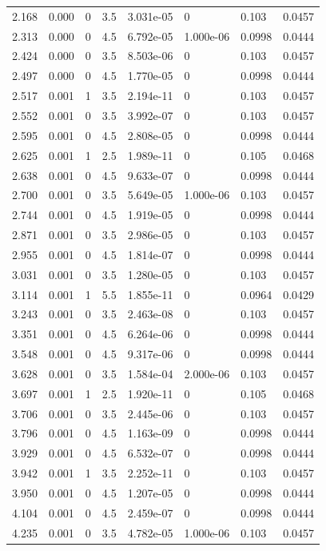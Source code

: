 \documentclass[preview]{standalone}
\begin{document}
{{\begin{tabular}{L{1.2cm}C{1.2cm} C{0.3cm}C{0.5cm} C{1.4cm}C{1.4cm} C{1.4cm}C{1.4cm}}
  2.168  &  0.000  & 0     & 3.5 &  3.031e-05  & 0  & 0.103 &  0.0457   \\ 
  2.313  &  0.000  & 0     & 4.5 &  6.792e-05  & 1.000e-06  & 0.0998 &  0.0444   \\ 
  2.424  &  0.000  & 0     & 3.5 &  8.503e-06  & 0  & 0.103 &  0.0457   \\ 
  2.497  &  0.000  & 0     & 4.5 &  1.770e-05  & 0  & 0.0998 &  0.0444   \\ 
  2.517  &  0.001  & 1     & 3.5 &  2.194e-11  & 0  & 0.103 &  0.0457   \\ 
  2.552  &  0.001  & 0     & 3.5 &  3.992e-07  & 0  & 0.103 &  0.0457   \\ 
  2.595  &  0.001  & 0     & 4.5 &  2.808e-05  & 0  & 0.0998 &  0.0444   \\ 
  2.625  &  0.001  & 1     & 2.5 &  1.989e-11  & 0  & 0.105 &  0.0468   \\ 
  2.638  &  0.001  & 0     & 4.5 &  9.633e-07  & 0  & 0.0998 &  0.0444   \\ 
  2.700  &  0.001  & 0     & 3.5 &  5.649e-05  & 1.000e-06  & 0.103 &  0.0457   \\ 
  2.744  &  0.001  & 0     & 4.5 &  1.919e-05  & 0  & 0.0998 &  0.0444   \\ 
  2.871  &  0.001  & 0     & 3.5 &  2.986e-05  & 0  & 0.103 &  0.0457   \\ 
  2.955  &  0.001  & 0     & 4.5 &  1.814e-07  & 0  & 0.0998 &  0.0444   \\ 
  3.031  &  0.001  & 0     & 3.5 &  1.280e-05  & 0  & 0.103 &  0.0457   \\ 
  3.114  &  0.001  & 1     & 5.5 &  1.855e-11  & 0  & 0.0964 &  0.0429   \\ 
  3.243  &  0.001  & 0     & 3.5 &  2.463e-08  & 0  & 0.103 &  0.0457   \\ 
  3.351  &  0.001  & 0     & 4.5 &  6.264e-06  & 0  & 0.0998 &  0.0444   \\ 
  3.548  &  0.001  & 0     & 4.5 &  9.317e-06  & 0  & 0.0998 &  0.0444   \\ 
  3.628  &  0.001  & 0     & 3.5 &  1.584e-04  & 2.000e-06  & 0.103 &  0.0457   \\ 
  3.697  &  0.001  & 1     & 2.5 &  1.920e-11  & 0  & 0.105 &  0.0468   \\ 
  3.706  &  0.001  & 0     & 3.5 &  2.445e-06  & 0  & 0.103 &  0.0457   \\ 
  3.796  &  0.001  & 0     & 4.5 &  1.163e-09  & 0  & 0.0998 &  0.0444   \\ 
  3.929  &  0.001  & 0     & 4.5 &  6.532e-07  & 0  & 0.0998 &  0.0444   \\ 
  3.942  &  0.001  & 1     & 3.5 &  2.252e-11  & 0  & 0.103 &  0.0457   \\ 
  3.950  &  0.001  & 0     & 4.5 &  1.207e-05  & 0  & 0.0998 &  0.0444   \\ 
  4.104  &  0.001  & 0     & 4.5 &  2.459e-07  & 0  & 0.0998 &  0.0444   \\ 
  4.235  &  0.001  & 0     & 3.5 &  4.782e-05  & 1.000e-06  & 0.103 &  0.0457   \\ 
\hline 
\end{tabular} 

}}
\end{document}
